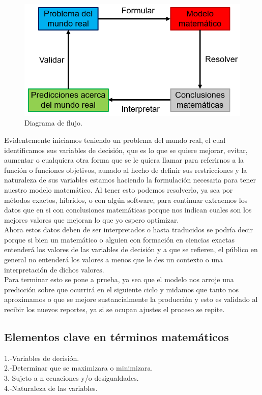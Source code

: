 \documentclass{article}
\begin{document}
\begin{figure}[htb!]
    \centering
    \includegraphics[width = 10 cm]{modelo.png}
    \caption{Diagrama de flujo.}
    \label{diagrama}
\end{figure}

Evidentemente iniciamos teniendo un problema del mundo real, el cual identificamos sus variables de decisión, que es lo que se quiere mejorar, evitar, aumentar o cualquiera otra forma que se le quiera llamar para referirnos a la función o funciones objetivos, aunado al hecho de definir sus restricciones y la naturaleza de sus variables estamos haciendo la formulación necesaria para tener nuestro modelo matemático.  \newline
Al tener esto podemos resolverlo, ya sea por métodos exactos, híbridos, o con algún software, para continuar  extraemos los datos que en si con conclusiones matemáticas porque nos indican cuales son los mejores valores que mejoran lo que yo espero optimizar. \\
Ahora estos datos deben de ser interpretados o hasta traducidos se podría decir porque si bien un matemático o alguien con formación en ciencias exactas entenderá los valores de las variables de decisión y a que se refieren, el público en general no entenderá los valores a menos que le des un contexto o una interpretación de dichos valores. \\
Para terminar esto se pone a prueba, ya sea que el modelo nos arroje una predicción sobre que ocurrirá en el siguiente ciclo y midamos que tanto nos aproximamos o que se mejore sustancialmente la producción y esto es validado al recibir los nuevos reportes, ya si se ocupan ajustes el proceso se repite. \\
\subsection*{Elementos clave en términos matemáticos} 
1.-Variables de decisión. \\
2.-Determinar que se maximizara o minimizara. \\
3.-Sujeto a n ecuaciones y/o desigualdades.\\
4.-Naturaleza de las variables. \\
\end{document}
